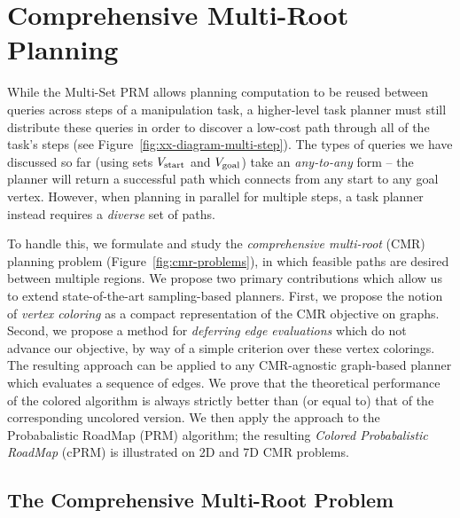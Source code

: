 \section{Comprehensive Multi-Root Planning}
\label{chap:cmr}

While the Multi-Set PRM
allows planning computation to be reused between queries
across steps of a manipulation task,
a higher-level task planner must still distribute these queries
in order to discover a low-cost path
through all of the task's steps
(see Figure~\ref{fig:xx-diagram-multi-step}).
The types of queries we have discussed so far
(using sets
$V_{\mbox{\scriptsize start}}$ and $V_{\mbox{\scriptsize goal}}$)
take an \emph{any-to-any} form
-- the planner will return a successful path which connects
from any start to any goal vertex.
However,
when planning in parallel for multiple steps,
a task planner instead requires a \emph{diverse} set of
paths.

To handle this,
we formulate and study the
\emph{comprehensive multi-root} (CMR) planning problem
\cite{dellin2015cmr} (Figure~\ref{fig:cmr-problems}),
in which feasible paths are desired between multiple regions.
We propose two primary contributions which allow us to extend
state-of-the-art sampling-based planners.
First, we propose the notion of \emph{vertex coloring} as a compact
representation of the CMR objective on graphs.
Second, we propose a method for \emph{deferring edge evaluations}
which do not advance our objective, by way of a simple
criterion over these vertex colorings.
The resulting approach can be applied to any CMR-agnostic 
graph-based planner which evaluates a sequence of edges.
We prove that the theoretical performance of the colored algorithm
is always strictly better than (or equal to)
that of the corresponding uncolored version.
We then apply the approach to the Probabalistic RoadMap (PRM)
algorithm;
the resulting \emph{Colored Probabalistic RoadMap} (cPRM)
is illustrated on 2D and 7D CMR problems.

\subsection{The Comprehensive Multi-Root Problem}

